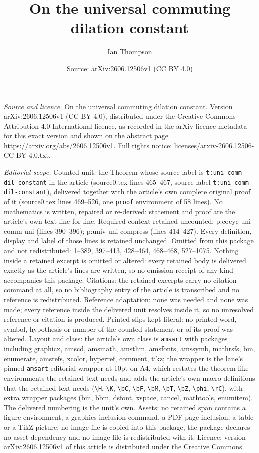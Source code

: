 \documentclass[10pt,a4paper]{amsart}
\title[On the universal commuting dilation constant]{On the universal commuting dilation constant}
\author{Ian Thompson}
\date{Source: arXiv:2606.12506v1 (CC BY 4.0)}
\begin{document}
\maketitle

\noindent\emph{Source and licence.} On the universal commuting dilation constant. Version arXiv:2606.12506v1 (CC BY 4.0), distributed under the Creative Commons Attribution 4.0 International licence, as recorded in the arXiv licence metadata for this exact version and shown on the abstract page https://arxiv.org/abs/2606.12506v1. Full rights notice: licenses/arxiv-2606.12506-CC-BY-4.0.txt.\par\smallskip

\noindent\textit{Editorial scope.} Counted unit: the Theorem whose source label is \texttt{t:uni-comm-dil-constant} in the article (source0.tex lines 465--467, source label \texttt{t:uni-comm-dil-constant}), delivered together with the article's own complete original proof of it (source0.tex lines 469--526, one \texttt{proof} environment of 58 lines). No mathematics is written, repaired or re-derived: statement and proof are the article's own text line for line. Required context retained uncounted: p:cocyc-uni-comm-uni (lines 390--396); p:univ-uni-compress (lines 414--427). Every definition, display and label of those lines is retained unchanged. Omitted from this package and not redistributed: 1--389, 397--413, 428--464, 468--468, 527--1075. Nothing inside a retained excerpt is omitted or altered: every retained body is delivered exactly as the article's lines are written, so no omission receipt of any kind accompanies this package. Citations: the retained excerpts carry no citation command at all, so no bibliography entry of the article is transcribed and no reference is redistributed. Reference adaptation: none was needed and none was made; every reference inside the delivered unit resolves inside it, so no unresolved reference or citation is produced. Printed slips kept literal: no printed word, symbol, hypothesis or number of the counted statement or of its proof was altered. Layout and class: the article's own class is \texttt{amsart} with packages including graphicx, amscd, amsmath, amsthm, amsfonts, amssymb, mathrsfs, bm, enumerate, amsrefs, xcolor, hyperref, comment, tikz; the wrapper is the lane's pinned \texttt{amsart} editorial wrapper at 10pt on A4, which restates the theorem-like environments the retained text needs and adds the article's own macro definitions that the retained text needs (\texttt{\textbackslash H}, \texttt{\textbackslash K}, \texttt{\textbackslash bC}, \texttt{\textbackslash bF}, \texttt{\textbackslash bM}, \texttt{\textbackslash bT}, \texttt{\textbackslash bZ}, \texttt{\textbackslash phi}, \texttt{\textbackslash rC}), with extra wrapper packages (bm, bbm, dsfont, xspace, cancel, mathtools, enumitem). The delivered numbering is the unit's own. Assets: no retained span contains a figure environment, a graphics-inclusion command, a PDF-page inclusion, a table or a TikZ picture; no image file is copied into this package, the package declares no asset dependency and no image file is redistributed with it. Licence: version arXiv:2606.12506v1 of this article is distributed under the Creative Commons 
\end{document}

